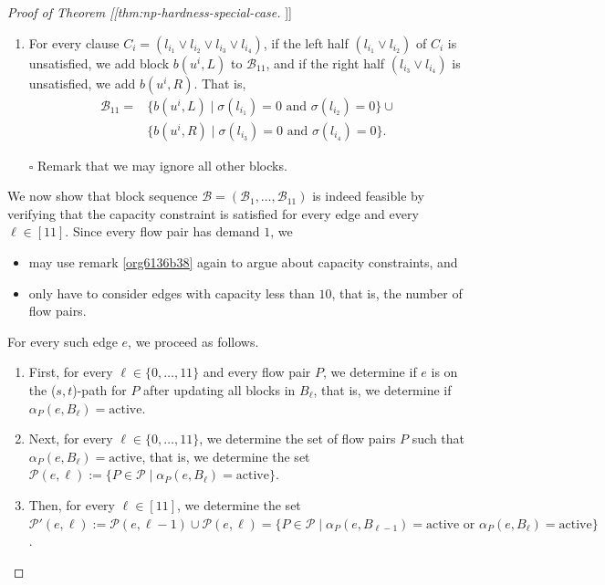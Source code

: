 \documentclass[fontsize=11pt,paper=a4]{book}
\begin{document}
\begin{proof}[Proof of Theorem [[thm:np-hardness-special-case]]]
\begin{enumerate}
\item For every clause \(C_i=(l_{i_1}\vee l_{i_2}\vee l_{i_3}\vee l_{i_4})\), if the left half \((l_{i_1}\vee l_{i_2})\) of \(C_i\) is unsatisfied, we add block \(b(u^i,L)\) to \(\mathscr{B}_{11}\), and if the right half \((l_{i_3}\vee l_{i_4})\) is unsatisfied, we add \(b(u^i,R)\).
That is,
\begin{align*}
\mathscr{B}_{11}=&\{b(u^i,L)\mid\sigma(l_{i_1})=0\text{ and }\sigma(l_{i_2})=0\}\cup\\
&\{b(u^i,R)\mid\sigma(l_{i_3})=0\text{ and }\sigma(l_{i_4})=0\}.
\end{align*}
\end{enumerate}


\begin{itemize}
\item[{$\square$}] Remark that we may ignore all other blocks.
\end{itemize}


We now show that block sequence \(\mathcal{B}=(\mathscr{B}_1,\dots,\mathscr{B}_{11})\) is indeed feasible by verifying that the capacity constraint is satisfied for every edge and every \(\ell\in[11]\).
Since every flow pair has demand \(1\), we

\begin{itemize}
\item may use remark \ref{org6136b38} again to argue about capacity constraints, and

\item only have to consider edges with capacity less than \(10\), that is, the number of flow pairs.
\end{itemize}


For every such edge \(e\), we proceed as follows.

\begin{enumerate}
\item First, for every \(\ell\in\{0,\dots,11\}\) and every flow pair \(P\), we determine if \(e\) is on the (\(s,t\))-path for \(P\) after updating all blocks in \(B_{\ell}\), that is, we determine if \(\alpha_P(e,B_{\ell})=\mathrm{active}\).

\item Next, for every \(\ell\in\{0,\dots,11\}\), we determine the set of flow pairs \(P\) such that \(\alpha_P(e,B_{\ell})=\mathrm{active}\), that is, we determine the set \(\mathcal{P}(e,\ell):=\{P\in\mathcal{P}\mid\alpha_P(e,B_{\ell})=\mathrm{active}\}\).

\item Then, for every \(\ell\in[11]\), we determine the set \(\mathcal{P}'(e,\ell):=\mathcal{P}(e,\ell-1)\cup\mathcal{P}(e,\ell)=\{P\in\mathcal{P}\mid\alpha_P(e,B_{\ell-1})=\mathrm{active}\text{ or }\alpha_P(e,B_{\ell})=\mathrm{active}\}\).


\end{enumerate}
\end{proof}
\end{document}
